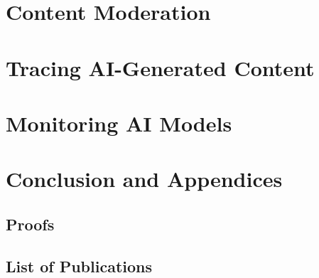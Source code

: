 \documentclass{these-dbl}
\begin{document}
\clearpage 
\clearpage 
\clearpage 

\mainmatter

\clearpage \part{Content Moderation}\label{part:content-moderation}

\clearpage 
\clearpage 



\clearpage \part{Tracing AI-Generated Content}\label{part:genai-tracing}

\clearpage 
\clearpage 
\clearpage 





\clearpage \part{Monitoring AI Models}\label{part:model-monitoring}

\clearpage 
\clearpage 


\clearpage \part{Conclusion and Appendices}\label{part:conclusion}
\clearpage 

\backmatter

\appendix
\clearpage
\chapter{Proofs} 

\clearpage 
\chapter{List of Publications}


\clearpage
\renewcommand{\glsnamefont}[1]{\makefirstuc{#1}}
\printnoidxglossaries


\clearpage 
{}
{\small


}
\end{document}
